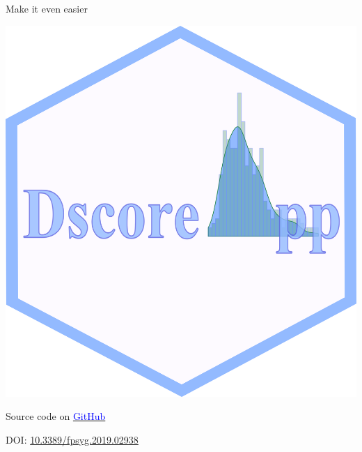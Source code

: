 \documentclass[compress]{beamer}
\begin{document}
\begin{frame}{Make it even easier}
	\begin{center}
		\href{http://fisppa.psy.unipd.it/DscoreApp/}{\includegraphics[width=0.4\linewidth]{AppLogo.png}}
	\end{center}
	\vspace{5mm}
	\color{black}
	Source code on \href{https://github.com/OttaviaE/DscoreApp}{\textcolor{blue}{GitHub}}	
	
	\vspace{3mm}
	DOI: \href{https://www.frontiersin.org/articles/10.3389/fpsyg.2019.02938/full}{10.3389/fpsyg.2019.02938}
\end{frame}
\end{document}
